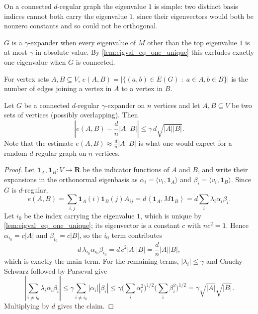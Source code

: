 \begin{lemma}
\label{lem:eigval_eq_one_unique}
\leanok
On a connected $d$-regular graph the eigenvalue $1$ is simple: two distinct basis indices cannot
both carry the eigenvalue $1$, since their eigenvectors would both be nonzero constants and so
could not be orthogonal.
\end{lemma}

\begin{definition}[Expander]
\label{def:expander}
\leanok
$G$ is a $\gamma$-expander when every eigenvalue of $M$ other than the top eigenvalue $1$ is at
most $\gamma$ in absolute value. By \ref{lem:eigval_eq_one_unique} this excludes exactly one
eigenvalue when $G$ is connected.
\end{definition}

\begin{definition}
\label{def:e_AB}
\leanok
For vertex sets $A, B \subseteq V$, $e(A, B) = |\{(a,b) \in E(G) \;:\; a \in A, b \in B\}|$ is the
number of edges joining a vertex in $A$ to a vertex in $B$.
\end{definition}

\begin{theorem}
\label{thm:expander_mixing_lemma}
\leanok
Let $G$ be a connected $d$-regular $\gamma$-expander on $n$ vertices and let $A, B \subseteq V$ be
two sets of vertices (possibly overlapping). Then
$$ \left| e(A,B) - \frac{d}{n} |A| |B| \right| \le \gamma\, d \sqrt{|A| |B|}. $$
Note that the estimate $e(A,B) \approx \frac{d}{n}|A||B|$ is what one would expect for a random
$d$-regular graph on $n$ vertices.
\end{theorem}

\begin{proof}
\leanok
{}
Let $\mathbf{1}_A, \mathbf{1}_B : V \to \mathbf{R}$ be the indicator functions of $A$ and $B$, and
write their expansions in the orthonormal eigenbasis as $\alpha_i = \langle v_i, \mathbf{1}_A
\rangle$ and $\beta_i = \langle v_i, \mathbf{1}_B \rangle$. Since $G$ is $d$-regular,
$$ e(A,B) = \sum_{i,j} \mathbf{1}_A(i) \mathbf{1}_B(j) A_{ij}
          = d \left\langle \mathbf{1}_A, M \mathbf{1}_B \right\rangle
          = d \sum_i \lambda_i \alpha_i \beta_i . $$
Let $i_0$ be the index carrying the eigenvalue $1$, which is unique by
\ref{lem:eigval_eq_one_unique}; its eigenvector is a constant $c$ with $n c^2 = 1$. Hence
$\alpha_{i_0} = c |A|$ and $\beta_{i_0} = c |B|$, so the $i_0$ term contributes
$$ d\,\lambda_{i_0} \alpha_{i_0} \beta_{i_0} = d\,c^2 |A| |B| = \frac{d}{n} |A| |B|, $$
which is exactly the main term. For the remaining terms, $|\lambda_i| \le \gamma$ and
Cauchy-Schwarz followed by Parseval give
$$ \left| \sum_{i \ne i_0} \lambda_i \alpha_i \beta_i \right|
   \le \gamma \sum_{i \ne i_0} |\alpha_i| |\beta_i|
   \le \gamma \Big( \sum_i \alpha_i^2 \Big)^{1/2} \Big( \sum_i \beta_i^2 \Big)^{1/2}
   = \gamma \sqrt{|A|}\sqrt{|B|} . $$
Multiplying by $d$ gives the claim.
\end{proof}
